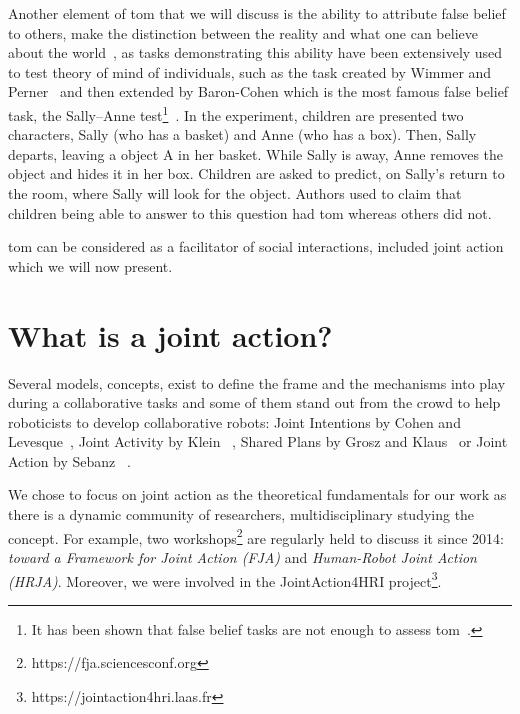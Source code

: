 \documentclass[a4paper,11pt,twoside]{StyleThese}
\begin{document}
Another element of \acrshort{tom} that we will discuss is the ability to attribute false belief to others, \ie make the distinction between the reality and what one can believe about the world~\cite{dennett_1978_brainstorms}, as tasks demonstrating this ability have been extensively used to test theory of mind of individuals, such as the task created by Wimmer and Perner~\cite{wimmer_1983_beliefs} and then extended by Baron-Cohen \etal{} which is the most famous false belief task, the Sally--Anne test\footnote{It has been shown that false belief tasks are not enough to assess \acrshort{tom}~\cite{bloom_2000_two, wellman_2001_meta}.}~\cite{wimmer_1983_beliefs, baron_1985_does}. In the experiment, children are presented two characters, Sally (who has a basket) and Anne (who has a box). Then, Sally departs, leaving a object A in her basket. While Sally is away, Anne removes the object and hides it in her box. Children are asked to predict, on Sally's return to the room, where Sally will look for the object. Authors used to claim that children being able to answer to this question had \acrshort{tom} whereas others did not.

\bigskip

\acrlong{tom} can be considered as a facilitator of social interactions, included joint action which we will now present.

\section{What is a joint action?}\label{chap1:sec:ja}
Several models, concepts, exist to define the frame and the mechanisms into play during a collaborative tasks and some of them stand out from the crowd to help roboticists to develop collaborative robots: Joint Intentions by Cohen and Levesque~\cite{cohen_1991_teamwork}, Joint Activity by Klein \etal{}~\cite{klein_2005_common}, Shared Plans by Grosz and Klaus~\cite{grosz_1996_collaborative} or Joint Action by Sebanz \etal{}~\cite{sebanz_2006_joint}.

We chose to focus on joint action as the theoretical fundamentals for our work as there is a dynamic community of researchers, multidisciplinary studying the concept. For example, two workshops\footnote{https://fja.sciencesconf.org} are regularly held to discuss it since 2014: \textit{toward a Framework for Joint Action (FJA)} and \textit{Human-Robot Joint Action (HRJA)}. Moreover, we were involved in the JointAction4HRI project\footnote{https://jointaction4hri.laas.fr}.
\end{document}
